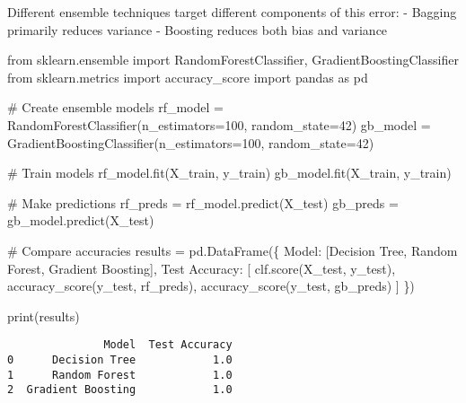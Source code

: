 \documentclass[
  letterpaper,
  DIV=11,
  numbers=noendperiod]{scrreprt}
\newenvironment{Shaded}{\begin{snugshade}}{\end{snugshade}}
\newcommand{\BuiltInTok}[1]{\textcolor[rgb]{0.00,0.23,0.31}{#1}}
\newcommand{\CommentTok}[1]{\textcolor[rgb]{0.37,0.37,0.37}{#1}}
\newcommand{\DecValTok}[1]{\textcolor[rgb]{0.68,0.00,0.00}{#1}}
\newcommand{\ImportTok}[1]{\textcolor[rgb]{0.00,0.46,0.62}{#1}}
\newcommand{\NormalTok}[1]{\textcolor[rgb]{0.00,0.23,0.31}{#1}}
\newcommand{\OperatorTok}[1]{\textcolor[rgb]{0.37,0.37,0.37}{#1}}
\newcommand{\StringTok}[1]{\textcolor[rgb]{0.13,0.47,0.30}{#1}}
\begin{document}
Different ensemble techniques target different components of this error:
- Bagging primarily reduces variance - Boosting reduces both bias and
variance

\begin{Shaded}
\begin{Highlighting}[]
\ImportTok{from}\NormalTok{ sklearn.ensemble }\ImportTok{import}\NormalTok{ RandomForestClassifier, GradientBoostingClassifier}
\ImportTok{from}\NormalTok{ sklearn.metrics }\ImportTok{import}\NormalTok{ accuracy\_score}
\ImportTok{import}\NormalTok{ pandas }\ImportTok{as}\NormalTok{ pd}

\CommentTok{\# Create ensemble models}
\NormalTok{rf\_model }\OperatorTok{=}\NormalTok{ RandomForestClassifier(n\_estimators}\OperatorTok{=}\DecValTok{100}\NormalTok{, random\_state}\OperatorTok{=}\DecValTok{42}\NormalTok{)}
\NormalTok{gb\_model }\OperatorTok{=}\NormalTok{ GradientBoostingClassifier(n\_estimators}\OperatorTok{=}\DecValTok{100}\NormalTok{, random\_state}\OperatorTok{=}\DecValTok{42}\NormalTok{)}

\CommentTok{\# Train models}
\NormalTok{rf\_model.fit(X\_train, y\_train)}
\NormalTok{gb\_model.fit(X\_train, y\_train)}

\CommentTok{\# Make predictions}
\NormalTok{rf\_preds }\OperatorTok{=}\NormalTok{ rf\_model.predict(X\_test)}
\NormalTok{gb\_preds }\OperatorTok{=}\NormalTok{ gb\_model.predict(X\_test)}

\CommentTok{\# Compare accuracies}
\NormalTok{results }\OperatorTok{=}\NormalTok{ pd.DataFrame(\{}
    \StringTok{\textquotesingle{}Model\textquotesingle{}}\NormalTok{: [}\StringTok{\textquotesingle{}Decision Tree\textquotesingle{}}\NormalTok{, }\StringTok{\textquotesingle{}Random Forest\textquotesingle{}}\NormalTok{, }\StringTok{\textquotesingle{}Gradient Boosting\textquotesingle{}}\NormalTok{],}
    \StringTok{\textquotesingle{}Test Accuracy\textquotesingle{}}\NormalTok{: [}
\NormalTok{        clf.score(X\_test, y\_test),}
\NormalTok{        accuracy\_score(y\_test, rf\_preds),}
\NormalTok{        accuracy\_score(y\_test, gb\_preds)}
\NormalTok{    ]}
\NormalTok{\})}

\BuiltInTok{print}\NormalTok{(results)}
\end{Highlighting}
\end{Shaded}

\begin{verbatim}
               Model  Test Accuracy
0      Decision Tree            1.0
1      Random Forest            1.0
2  Gradient Boosting            1.0
\end{verbatim}
\end{document}
